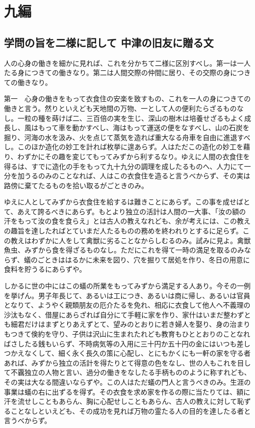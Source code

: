 \documentclass[a4paper, platex, dvipdfmx]{jsarticle}
\begin{document}
\section{九編}
\subsection{学問の旨を二様に記して 中津の旧友に贈る文}
人の心身の働きを細かに見れば、これを分かちて二様に区別すべし。第一は一人たる身につきての働きなり。第二は人間交際の仲間に居り、その交際の身につきての働きなり。

第一　心身の働きをもって衣食住の安楽を致すもの、これを一人の身につきての働きと言う。然りといえども天地間の万物、一として人の便利たらざるものなし。一粒の種を蒔けば二、三百倍の実を生じ、深山の樹木は培養せざるもよく成長し、風はもって車を動かすべし、海はもって運送の便をなすべし、山の石炭を掘り、河海の水を汲み、火を点じて蒸気を造れば重大なる舟車を自由に進退すべし。このほか造化の妙工を計れば枚挙に遑あらず。人はただこの造化の妙工を藉り、わずかにその趣を変じてもってみずから利するなり。ゆえに人間の衣食住を得るは、すでに造化の手をもって九十九分の調理を成したるものへ、人力にて一分を加うるのみのことなれば、人はこの衣食住を造ると言うべからず、その実は路傍に棄てたるものを拾い取るがごときのみ。

ゆえに人としてみずから衣食住を給するは難きことにあらず。この事を成せばとて、あえて誇るべきにあらず。もとより独立の活計は人間の一大事、「汝の額の汗をもって汝の食を食らえ」とは古人の教えなれども、余が考えには、この教えの趣旨を達したればとていまだ人たるものの務めを終われりとするに足らず。この教えはわずかに人をして禽獣に劣ることなからしむるのみ。試みに見よ。禽獣魚虫、みずから食を得ざるものなし。ただにこれを得て一時の満足を取るのみならず、蟻のごときははるかに未来を図り、穴を掘りて居処を作り、冬日の用意に食料を貯うるにあらずや。

しかるに世の中にはこの蟻の所業をもってみずから満足する人あり。今その一例を挙げん。男子年長じて、あるいは工につき、あるいは商に帰し、あるいは官員となりて、ようやく親類朋友の厄介たるを免れ、相応に衣食して他人へ不義理の沙汰もなく、借屋にあらざれば自分にて手軽に家を作り、家什はいまだ整わずとも細君だけはまずとりあえずとて、望みのとおりに若き婦人を娶り、身の治まりもつきて倹約を守り、子供は沢山に生まれたれども教育もひととおりのことなればさしたる銭もいらず、不時病気等の入用に三十円か五十円の金にはいつも差しつかえなくして、細く永く長久の策に心配し、とにもかくにも一軒の家を守る者あれば、みずから独立の活計を得たりとて得意の色をなし、世の人もこれを目して不覊独立の人物と言い、過分の働きをなしたる手柄もののように称すれども、その実は大なる間違いならずや。この人はただ蟻の門人と言うべきのみ。生涯の事業は蟻の右に出ずるを得ず。その衣食を求め家を作るの際に当たりては、額に汗を流せしこともあらん、胸に心配せしこともあらん、古人の教えに対して恥ずることなしといえども、その成功を見れば万物の霊たる人の目的を達したる者と言うべからず。
\end{document}
